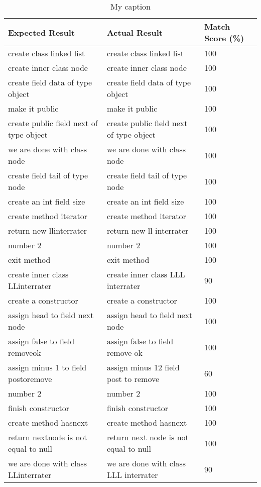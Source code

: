 \begin{table}[H]
\centering
\begin{tabular}{|p{6cm}|p{6cm}|p{2cm}|}
\hline
{\bf Expected Result} & {\bf Actual Result} & {\bf Match Score (\%)} \\ \hline
 create class linked list & create class linked list & 100 \\ \hline
 create inner class node & create inner class node & 100 \\ \hline
 create field data of type object & create field data of type object & 100 \\ \hline
 make it public & make it public & 100 \\ \hline
 create public field next of type object & create public field next of type object & 100 \\ \hline
 we are done with class node & we are done with class node & 100 \\ \hline
 create field tail of type node & create field tail of type node & 100 \\ \hline
 create an int field size & create an int field size & 100 \\ \hline
 create method iterator & create method iterator & 100 \\ \hline
 return new llinterrater & return new ll interrater & 100 \\ \hline
 number 2 & number 2 & 100 \\ \hline
 exit method & exit method & 100 \\ \hline
 create inner class LLinterrater & create inner class LLL interrater & 90 \\ \hline
 create a constructor & create a constructor & 100\\ \hline
 assign head to field next node & assign head to field next node & 100 \\ \hline
 assign false to field removeok & assign false to field remove ok & 100 \\ \hline
 assign minus 1 to field postoremove & assign minus 12 field post to remove & 60 \\ \hline
 number 2 & number 2 & 100 \\ \hline
 finish constructor & finish constructor & 100 \\ \hline
 create method hasnext & create method hasnext & 100 \\ \hline
 return nextnode is not equal to null & return next node is not equal to null & 100 \\ \hline
 we are done with class LLinterrater & we are done with class LLL interrater & 90 \\ \hline
\end{tabular}
\caption{My caption}
\label{tab16}
\end{table}
